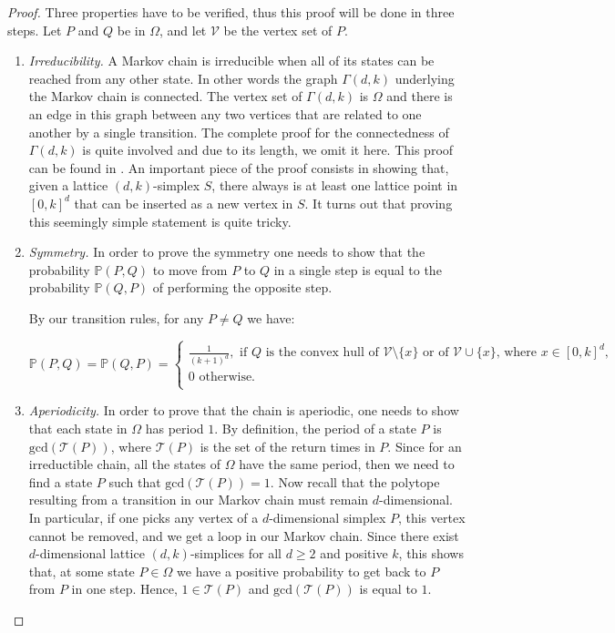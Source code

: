 \documentclass[a4paper]{article}
\begin{document}
\begin{proof}
  Three properties have to be verified, thus this proof will be done in three steps. Let $P$ and $Q$ be in $\Omega$, and let $\mathcal{V}$ be the vertex set of $P$.

  \begin{enumerate}[i]
    \item \textit{Irreducibility.}
    A Markov chain is irreducible when all of its states can be reached from any other state. In other words the graph $\Gamma(d,k)$ underlying the Markov chain is connected. The vertex set of $\Gamma(d, k)$ is $\Omega$ and there is an edge in this graph between any two vertices that are related to one another by a single transition. The complete proof for the connectedness of $\Gamma(d,k)$ is quite involved and due to its length, we omit it here. This proof can be found in \cite{DavidPourninRakotonarivo2018}. An important piece of the proof consists in showing that, given a lattice $(d,k)$-simplex $S$, there always is at least one lattice point in $[0,k]^d$ that can be inserted as a new vertex in $S$. It turns out that proving this seemingly simple statement is quite tricky.

    \item \textit{Symmetry.}
    In order to prove the symmetry one needs to show that the probability $\mathbb{P}(P,Q)$ to move from $P$ to $Q$ in a single step is equal to the probability $\mathbb{P}(Q,P)$ of performing the opposite step.

    By our transition rules, for any $P \neq Q$ we have:

    $$
      \mathbb{P}(P,Q)=\mathbb{P}(Q,P) =
      \begin{cases}
        \frac{1}{(k+1)^d}, \text{ if }Q\mbox{ is the convex hull of }\mathcal{V}\mathord{\setminus}\{x\}\mbox{ or of }\mathcal{V}\cup\{x\}\mbox{, where }x\in [0,k]^d\mbox{,}\\
        0 \mbox{ otherwise.}\\
      \end{cases}
    $$

     \item \textit{Aperiodicity.}
     In order to prove that the chain is aperiodic, one needs to show that each state in $\Omega$ has period $1$. By definition, the period of a state $P$ is $\mathrm{gcd}(\mathcal{T}(P))$, where $\mathcal{T}(P)$ is the set of the return times in $P$. Since for an irreductible chain, all the states of $\Omega$ have the same period, then we need to find a state $P$ such that $\mathrm{gcd}(\mathcal{T}(P)) = 1$. Now recall that the polytope resulting from a transition in our Markov chain must remain $d$-dimensional. In particular, if one picks any vertex of a $d$-dimensional simplex $P$, this vertex cannot be removed, and we get a loop in our Markov chain. Since there exist $d$-dimensional lattice $(d,k)$-simplices for all $d\geq2$ and positive $k$, this shows that, at some state $P \in\Omega$ we have a positive probability to get back to $P$ from $P$ in one step.
     Hence, $1\in\mathcal{T}(P)$ and $\mathrm{gcd}(\mathcal{T}(P))$ is equal to $1$.
   \end{enumerate}
\end{proof}
\end{document}

